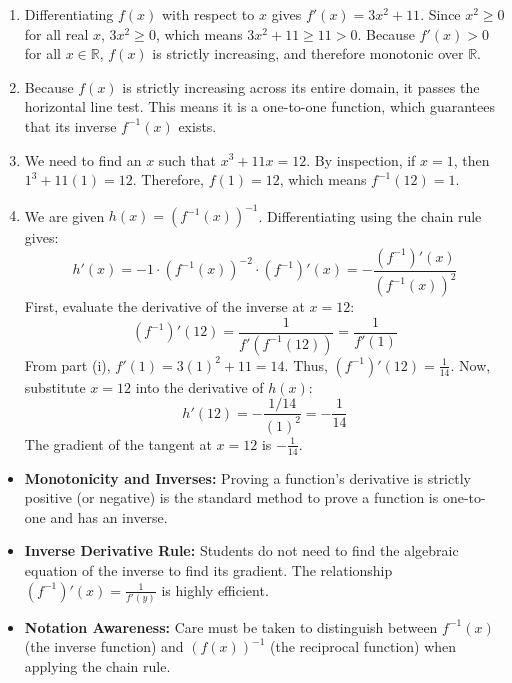 \begin{solution}
\begin{enumerate}
    \item[(i)] Differentiating $f(x)$ with respect to $x$ gives $f'(x) = 3x^2 + 11$. Since $x^2 \geq 0$ for all real $x$, $3x^2 \geq 0$, which means $3x^2 + 11 \geq 11 > 0$. Because $f'(x) > 0$ for all $x \in \mathbb{R}$, $f(x)$ is strictly increasing, and therefore monotonic over $\mathbb{R}$.
    
    \item[(ii)] Because $f(x)$ is strictly increasing across its entire domain, it passes the horizontal line test. This means it is a one-to-one function, which guarantees that its inverse $f^{-1}(x)$ exists.
    
    \item[(iii)] We need to find an $x$ such that $x^3 + 11x = 12$. By inspection, if $x = 1$, then $1^3 + 11(1) = 12$. Therefore, $f(1) = 12$, which means $f^{-1}(12) = 1$.
    
    \item[(iv)] We are given $h(x) = (f^{-1}(x))^{-1}$. Differentiating using the chain rule gives:
    \[ h'(x) = -1 \cdot (f^{-1}(x))^{-2} \cdot (f^{-1})'(x) = -\frac{(f^{-1})'(x)}{(f^{-1}(x))^2} \]
    First, evaluate the derivative of the inverse at $x = 12$:
    \[ (f^{-1})'(12) = \frac{1}{f'(f^{-1}(12))} = \frac{1}{f'(1)} \]
    From part (i), $f'(1) = 3(1)^2 + 11 = 14$. Thus, $(f^{-1})'(12) = \frac{1}{14}$.
    Now, substitute $x = 12$ into the derivative of $h(x)$:
    \[ h'(12) = -\frac{1/14}{(1)^2} = -\frac{1}{14} \]
    The gradient of the tangent at $x = 12$ is $-\frac{1}{14}$.
\end{enumerate}
\end{solution}

\begin{takeaways}
\begin{itemize}[leftmargin=*]
\item \textbf{Monotonicity and Inverses:} Proving a function's derivative is strictly positive (or negative) is the standard method to prove a function is one-to-one and has an inverse.
\item \textbf{Inverse Derivative Rule:} Students do not need to find the algebraic equation of the inverse to find its gradient. The relationship $(f^{-1})'(x) = \frac{1}{f'(y)}$ is highly efficient.
\item \textbf{Notation Awareness:} Care must be taken to distinguish between $f^{-1}(x)$ (the inverse function) and $(f(x))^{-1}$ (the reciprocal function) when applying the chain rule.
\end{itemize}
\end{takeaways}


